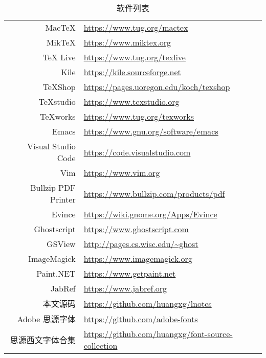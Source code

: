\begin{sidewaystable}[!h]
  \caption{软件列表}
  \label{tab:software_list}
  \centering
  \begin{tabular}{rl}
    \toprule
      MacTeX              & \url{https://www.tug.org/mactex} \\
      MikTeX              & \url{https://www.miktex.org} \\
      TeX Live            & \url{https://www.tug.org/texlive} \\
    \midrule
      Kile                & \url{https://kile.sourceforge.net} \\
      TeXShop             & \url{https://pages.uoregon.edu/koch/texshop} \\
      TeXstudio           & \url{https://www.texstudio.org} \\
      TeXworks            & \url{https://www.tug.org/texworks} \\
    \midrule
      Emacs               & \url{https://www.gnu.org/software/emacs} \\
      Visual Studio Code  & \url{https://code.visualstudio.com} \\
      Vim                 & \url{https://www.vim.org} \\
    \midrule
      Bullzip PDF Printer & \url{https://www.bullzip.com/products/pdf} \\
      Evince              & \url{https://wiki.gnome.org/Apps/Evince} \\
      Ghostscript         & \url{https://www.ghostscript.com} \\
      GSView              & \url{http://pages.cs.wisc.edu/~ghost} \\
    \midrule
      ImageMagick         & \url{https://www.imagemagick.org} \\
      Paint.NET           & \url{https://www.getpaint.net} \\
    \midrule
      JabRef              & \url{https://www.jabref.org} \\
    \midrule
      本文源码             & \url{https://github.com/huangxg/lnotes} \\
      Adobe 思源字体       & \url{https://github.com/adobe-fonts} \\
      思源西文字体合集     & \url{https://github.com/huangxg/font-source-collection} \\
    \bottomrule
  \end{tabular}
\end{sidewaystable}
